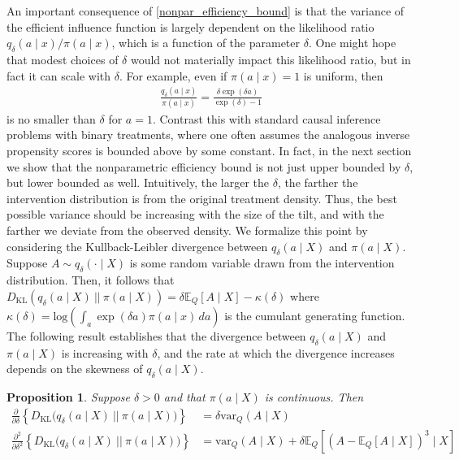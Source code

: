 \documentclass[11pt,twoside]{article}
\newcommand{\var}{\text{var}}
\newtheorem{proposition}{Proposition}
\theoremstyle{definition}
\theoremstyle{remark}
\begin{document}
An important consequence of \cref{nonpar_efficiency_bound} is that the variance of the efficient influence function is largely dependent on the likelihood ratio ${q_\delta(a \mid x)}/{\pi(a \mid x)}$, which is a function of the parameter $\delta$. One might hope that modest choices of $\delta$ would not materially impact this likelihood ratio, but in fact it 
can scale with $\delta$. For example, even if $\pi(a \mid x)=1$ is uniform, then 
\begin{align*}
    \frac{q_\delta(a \mid x)}{\pi(a \mid x)} = \frac{\delta \exp(\delta a)}{\exp(\delta) - 1}
\end{align*}
is no smaller than $\delta$ for $a=1$. Contrast this with standard causal inference problems with binary treatments, where one often assumes the analogous inverse propensity scores is bounded above by some constant. In fact, in the next section we show that the nonparametric efficiency bound is not just upper bounded by $\delta$, but lower bounded as well. Intuitively,  the larger the $\delta$, the farther the intervention distribution is from the original treatment density. Thus, the best possible variance should be increasing with the size of the tilt, and with the farther we deviate from the observed density. We formalize this point by considering the Kullback-Leibler divergence between $q_\delta(a \mid X)$ and $\pi(a \mid X)$. Suppose $A \sim q_\delta( \cdot \mid X)$ is some random variable drawn from the intervention distribution. Then, it follows that $ D_{\text{KL}}(q_\delta(a \mid X) \: || \: \pi(a \mid X)) = \delta \mathbb{E}_Q[A \mid X] - \kappa(\delta)$ where $\kappa(\delta) = \text{log}\left(\int_a \exp(\delta a) \pi(a \mid x) \, da \right)$ is the cumulant generating function. The following result establishes that the divergence between $q_\delta(a \mid X)$ and $\pi(a \mid X)$ is increasing with $\delta$, and the rate at which the divergence increases depends on the skewness of $q_\delta(a \mid X)$.

\begin{proposition}
     \label{kl_divergence_lemma}
    Suppose $\delta > 0$ and that $\pi(a \mid X)$ is continuous. Then
    \begin{align*}
        \frac{\partial}{\partial \delta} \left\{ D_{\text{KL}}\Big(q_\delta(a \mid X) \: || \: \pi(a \mid X) \Big) \right\} &= \delta \var_Q(A \mid X) \\
        \frac{\partial^2}{\partial \delta^2}  \left\{ D_{\text{KL}}\Big(q_\delta(a \mid X) \: || \: \pi(a \mid X) \Big) \right\} 
        &= \var_Q(A \mid X) + \delta \mathbb{E}_Q\left[(A - \mathbb{E}_Q[A \mid X])^3 \mid X \right]
    \end{align*} 
\end{proposition}
\end{document}
